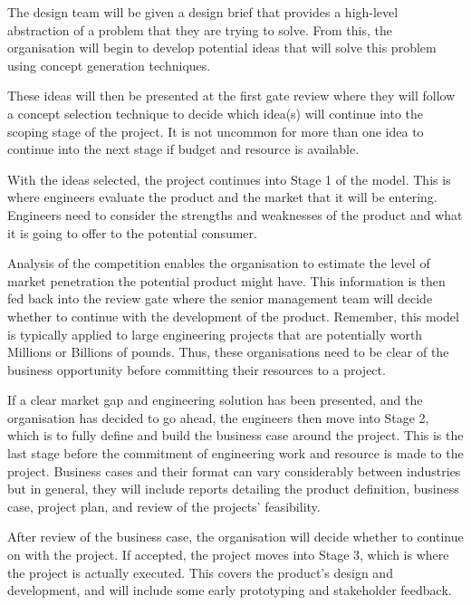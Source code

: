The design team will be given a design brief that provides a high-level abstraction of a problem that they are trying to solve. From this, the organisation will begin to develop potential ideas that will solve this problem using concept generation techniques. 

These ideas will then be presented at the first gate review where they will follow a concept selection technique to decide which idea(s) will continue into the scoping stage of the project. It is not uncommon for more than one idea to continue into the next stage if budget and resource is available.

With the ideas selected, the project continues into Stage 1 of the model. This is where engineers evaluate the product and the market that it will be entering. Engineers need to consider the strengths and weaknesses of the product and what it is going to offer to the potential consumer. 

Analysis of the competition enables the organisation to estimate the level of market penetration the potential product might have. This information is then fed back into the review gate where the senior management team will decide whether to continue with the development of the product. Remember, this model is typically applied to large engineering projects that are potentially worth Millions or Billions of pounds. Thus, these organisations need to be clear of the business opportunity before committing their resources to a project.

If a clear market gap and engineering solution has been presented, and the organisation has decided to go ahead, the engineers then move into Stage 2, which is to fully define and build the business case around the project. This is the last stage before the commitment of engineering work and resource is made to the project. Business cases and their format can vary considerably between industries but in general, they will include reports detailing the product definition, business case, project plan, and review of the projects' feasibility.

After review of the business case, the organisation will decide whether to continue on with the project. If accepted, the project moves into Stage 3, which is where the project is actually executed. This covers the product's design and development, and will include some early prototyping and stakeholder feedback.

